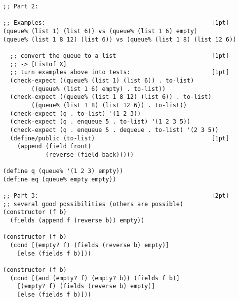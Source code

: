 \documentclass[12pt]{article}                   %
\newenvironment{solution}{}{}
\begin{document}
\begin{problem}
\begin{solution}
\begin{verbatim}
;; Part 2:

;; Examples:                                               [1pt]
(queue% (list 1) (list 6)) vs (queue% (list 1 6) empty)
(queue% (list 1 8 12) (list 6)) vs (queue% (list 1 8) (list 12 6))

  ;; convert the queue to a list                           [1pt]
  ;; -> [Listof X] 
  ;; turn examples above into tests:                       [1pt]
  (check-expect ((queue% (list 1) (list 6)) . to-list)
		((queue% (list 1 6) empty) . to-list))
  (check-expect ((queue% (list 1 8 12) (list 6)) . to-list)
		((queue% (list 1 8) (list 12 6)) . to-list))
  (check-expect (q . to-list) '(1 2 3))                    
  (check-expect (q . enqueue 5 . to-list) '(1 2 3 5))   
  (check-expect (q . enqueue 5 . dequeue . to-list) '(2 3 5))
  (define/public (to-list)                                 [1pt]
    (append (field front)
            (reverse (field back)))))

(define q (queue% '(1 2 3) empty))
(define eq (queue% empty empty))

;; Part 3:                                                 [2pt]
;; several good possibilities (others are possible)
(constructor (f b)
  (fields (append f (reverse b)) empty))

(constructor (f b)
  (cond [(empty? f) (fields (reverse b) empty)]
	[else (fields f b)]))

(constructor (f b)
  (cond [(and (empty? f) (empty? b)) (fields f b)]
	[(empty? f) (fields (reverse b) empty)]
	[else (fields f b)]))

\end{verbatim}
\end{solution}
\end{problem}

\newpage
\ifrubric{}
\newpage
\fi
\end{document}
